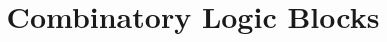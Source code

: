 \documentclass[11pt,a4paper]{article}
\begin{document}
\title{Combinatory Logic Blocks}
\date{}
\maketitle

\tableofcontents





\end{document}
